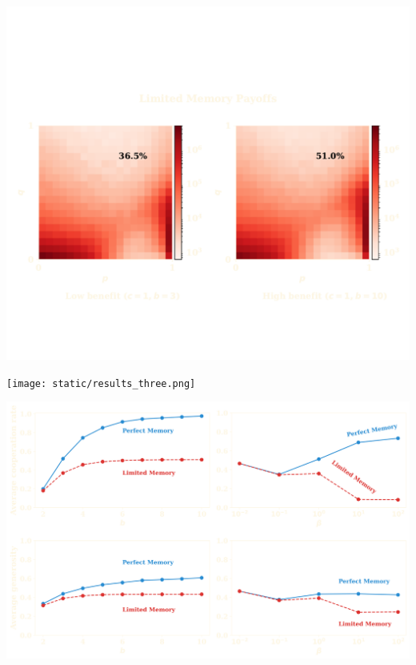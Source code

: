 \documentclass{beamer}
\begin{document}
\begin{frame}
    \centering
    \includegraphics[width=\textwidth]{static/results_two.pdf}
\end{frame}

\begin{frame}
    \centering
    \texttt{[image: static/results\_three.png]}
\end{frame}

\begin{frame}
    \centering
    \includegraphics[width=\textwidth]{static/results_four.png}
\end{frame}

\begin{frame}
    \centering
    
\end{frame}
\end{document}
